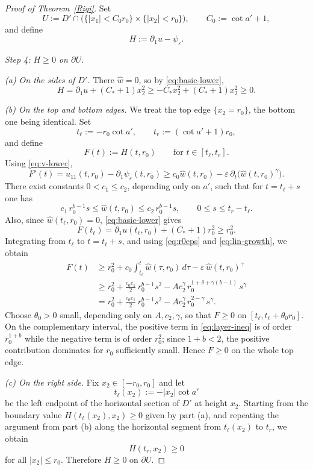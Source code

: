 \documentclass[reqno,11pt]{amsart}
\numberwithin{equation}{section}
\theoremstyle{remark}
\begin{document}
\begin{proof}[Proof of Theorem~\ref{Rigi}]
Set
\[
U:=D'\cap\bigl(\{|x_1|<C_0r_0\}\times \{|x_2|<r_0\}\bigr),
\qquad
C_0:=\cot a'+1,
\]
and define
\[
H:=\partial_1u-\psi_\varepsilon.
\]

\medskip
\noindent\textit{Step 4: $H\ge0$ on $\partial U$.}

\smallskip
\noindent\emph{(a) On the sides of $D'$.}
There $\hat w=0$, so by \eqref{eq:basic-lower},
\[
H=\partial_1u+(C_\ast+1)x_2^2
\ge -C_\ast x_2^2+(C_\ast+1)x_2^2
\ge0.
\]

\smallskip
\noindent\emph{(b) On the top and bottom edges.}
We treat the top edge $\{x_2=r_0\}$, the bottom one being identical.
Set
\[
t_\ell:=-r_0\cot a',
\qquad
t_r:=(\cot a'+1)r_0,
\]
and define
\[
F(t):=H(t,r_0)
\qquad\text{for }t\in[t_\ell,t_r].
\]
Using \eqref{eq:v-lower},
\[
F'(t)
=
u_{11}(t,r_0)-\partial_1\psi_\varepsilon(t,r_0)
\ge c_0\hat w(t,r_0)-\varepsilon\,\partial_t\bigl(\hat w(t,r_0)^\gamma\bigr).
\]
There exist constants $0<c_1\le c_2$, depending only on $a'$, such that
for $t=t_\ell+s$ one has
\begin{equation}\label{eq:lin-growth}
c_1\,r_0^{b-1}s\le \hat w(t,r_0)\le c_2\,r_0^{b-1}s,
\qquad 0\le s\le t_r-t_\ell.
\end{equation}
Also, since $\hat w(t_\ell,r_0)=0$, \eqref{eq:basic-lower} gives
\[
F(t_\ell)=\partial_1u(t_\ell,r_0)+(C_\ast+1)r_0^2\ge r_0^2.
\]
Integrating from $t_\ell$ to $t=t_\ell+s$, and using \eqref{eq:r0eps} and \eqref{eq:lin-growth},
we obtain
\begin{align}
F(t)
&\ge r_0^2 + c_0\int_{t_\ell}^{t}\hat w(\tau,r_0)\,d\tau
-\varepsilon\,\hat w(t,r_0)^\gamma \nonumber\\
&\ge r_0^2+\frac{c_0c_1}{2}\,r_0^{b-1}s^2
-Ac_2^\gamma\,r_0^{1+\delta+\gamma(b-1)}\,s^\gamma \nonumber\\
&= r_0^2+\frac{c_0c_1}{2}\,r_0^{b-1}s^2
-Ac_2^\gamma\,r_0^{2-\gamma}\,s^\gamma. \label{eq:layer-ineq}
\end{align}
Choose $\theta_0>0$ small, depending only on $A,c_2,\gamma$, so that
$F\ge0$ on $[t_\ell,t_\ell+\theta_0r_0]$.
On the complementary interval, the positive term in \eqref{eq:layer-ineq}
is of order $r_0^{1+b}$ while the negative term is of order $r_0^2$;
since $1+b<2$, the positive contribution dominates for $r_0$ sufficiently small.
Hence $F\ge0$ on the whole top edge.

\smallskip
\noindent\emph{(c) On the right side.}
Fix $x_2\in[-r_0,r_0]$ and let
\[
t_\ell(x_2):=-|x_2|\cot a'
\]
be the left endpoint of the horizontal section of $D'$ at height $x_2$.
Starting from the boundary value $H(t_\ell(x_2),x_2)\ge0$ given by part (a), and repeating
the argument from part (b) along the horizontal segment from $t_\ell(x_2)$ to $t_r$, we obtain
\[
H(t_r,x_2)\ge0
\]
for all $|x_2|\le r_0$.
Therefore $H\ge0$ on $\partial U$.


\end{proof}
\end{document}
